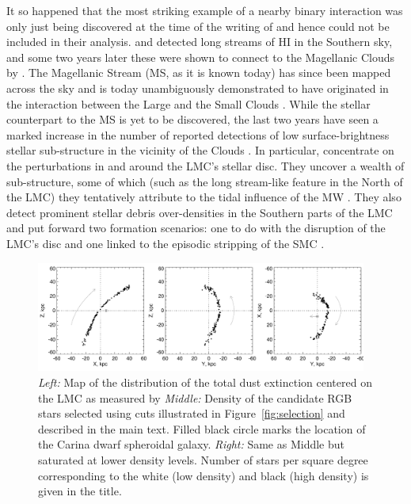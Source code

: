 \documentclass[a4paper,useAMS,usenatbib]{mnras}
\begin{document}
It so happened that the most striking example of a nearby binary
interaction was only just being discovered at the time of the writing
of \citet{Toomre1972} and hence could not be included in their
analysis. \citet{Wannier1972} and \citet{Kuilenburg1972} detected long
streams of HI in the Southern sky, and some two years later these were
shown to connect to the Magellanic Clouds by
\citet{Mathewson1974}. The Magellanic Stream (MS, as it is known
today) has since been mapped across the sky \citep[see
  e.g.][]{Putman2003,Nidever2008,Nidever2010} and is today
unambiguously demonstrated to have originated in the interaction
between the Large and the Small Clouds \citep[LMC and
  SMC,][]{Besla2007, Besla2010, Diaz2011, Diaz2012}. While the stellar
counterpart to the MS is yet to be discovered, the last two years have
seen a marked increase in the number of reported detections of low
surface-brightness stellar sub-structure in the vicinity of the Clouds
\citep[see
  e.g.][]{Mackey2016,Belokurov2016,Belokurov2017,Deason2017,Pieres2017,Mackey2018,Nidever2018}. In
particular, \citet{Mackey2016,Mackey2018} concentrate on the
perturbations in and around the LMC's stellar disc. They uncover a
wealth of sub-structure, some of which (such as the long stream-like
feature in the North of the LMC) they tentatively attribute to the
tidal influence of the MW \citep[][]{Mackey2016}. They also
detect prominent stellar debris over-densities in the Southern parts
of the LMC and put forward two formation scenarios: one to do with the
disruption of the LMC's disc and one linked to the episodic stripping
of the SMC \citep[see also][who argued for the importance of repeated
  interactions with the SMC]{besla_etal_2016}.

%
\begin{figure}
  \centering
  \includegraphics[width=0.97\textwidth]{orphan_paper_xyz_members.pdf}
  \caption[]{ {\it Left:} Map of the distribution of the total dust
    extinction centered on the LMC as measured by \citet{SFD} {\it
      Middle:} Density of the candidate RGB stars selected using cuts
    illustrated in Figure~\ref{fig:selection} and described in the
    main text. Filled black circle marks the location of the Carina
    dwarf spheroidal galaxy. {\it Right:} Same as Middle but saturated
    at lower density levels. Number of stars per square degree
    corresponding to the white (low density) and black (high density)
    is given in the title.}
   \label{fig:map}
\end{figure}
%
\end{document}
